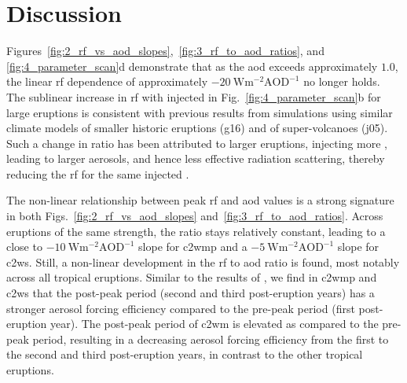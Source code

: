 \documentclass{ametsocV6.1}
\newcommand{\iso}[1][i]{{#1}njected \ce{SO2}}
\begin{document}
\section{Discussion}\label{sec:discussion}


Figures~\ref{fig:2_rf_vs_aod_slopes},~\ref{fig:3_rf_to_aod_ratios}, and
\ref{fig:4_parameter_scan}d demonstrate that as the \gls{aod} exceeds approximately
\(1.0\), the linear \gls{rf} dependence of approximately
\(\SI{-20}{\watt\metre^{-2}\mathrm{AOD}^{-1}}\) no longer holds. The sublinear increase
in \gls{rf} with \iso{} in Fig.~\ref{fig:4_parameter_scan}b for large eruptions is
consistent with previous results from simulations using similar climate models of
smaller historic eruptions (\gls{g16}) and of super-volcanoes (\gls{j05}). Such a change
in ratio has been attributed to larger eruptions, injecting more , leading to
larger aerosols, and hence less effective radiation scattering, thereby reducing the
\gls{rf} for the same \iso{} \citep{english2013, timmreck2010, timmreck2018}.

The non-linear relationship between peak \gls{rf} and \gls{aod} values is a strong
signature in both Figs.~\ref{fig:2_rf_vs_aod_slopes} and~\ref{fig:3_rf_to_aod_ratios}.
Across eruptions of the same strength, the ratio stays relatively constant, leading to a
close to \(\SI{-10}{\watt\metre^{-2}\mathrm{AOD}^{-1}}\) slope for \gls{c2wmp} and a
\(\SI{-5}{\watt\metre^{-2}\mathrm{AOD}^{-1}}\) slope for \gls{c2ws}. Still, a non-linear
development in the \gls{rf} to \gls{aod} ratio is found, most notably across all
tropical eruptions. Similar to the results of \citet{marshall2020}, we find in
\gls{c2wmp} and \gls{c2ws} that the post-peak period (second and third post-eruption
years) has a stronger aerosol forcing efficiency compared to the pre-peak period (first
post-eruption year). The post-peak period of \gls{c2wm} is elevated as compared to the
pre-peak period, resulting in a decreasing aerosol forcing efficiency from the first to
the second and third post-eruption years, in contrast to the other tropical eruptions.
\end{document}
